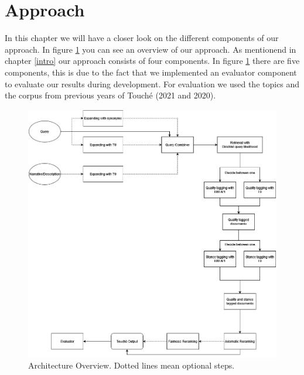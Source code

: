 \section{Approach} \label{approach}
    In this chapter we will have a closer look on the different components of our approach. In figure \ref{fig:pipeline} you can see an overview of our approach. As mentionend in chapter \ref{intro} our approach consists of four components. In figure \ref{fig:pipeline} there are five components, this is due to the fact that we implemented an evaluator component to evaluate our results during development. For evaluation we used the topics and the corpus from previous years of Touché (2021 and 2020).

    \begin{figure}[h]
        \centering
        \includegraphics[scale=0.4]{figures/pipeline}
        \caption{Architecture Overview. Dotted lines mean optional steps.}
        \label{fig:pipeline}
    \end{figure}

